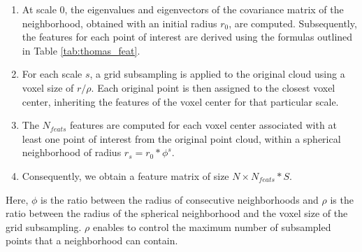 \documentclass{article}
\begin{document}
\begin{enumerate}
    \item At scale 0, the eigenvalues and eigenvectors of the covariance matrix of the neighborhood, obtained with an initial radius $r_0$, are computed. Subsequently, the features for each point of interest are derived using the formulas outlined in Table \ref{tab:thomas_feat}.
    \item  For each scale $s$, a grid subsampling is applied to the original cloud using a voxel size of $r/\rho$. Each original point is then assigned to the closest voxel center, inheriting the features of the voxel center for that particular scale. 
    \item The $N_{feats}$ features are computed for each voxel center associated with at least one point of interest from the original point cloud, within a spherical neighborhood of radius $r_s = r_0 * \phi^s$.
    \item Consequently, we obtain a feature matrix of size $N \times N_{feats} * S$.
\end{enumerate}
Here, $\phi$ is the ratio between the radius of consecutive neighborhoods and $\rho$ is the ratio between the radius of the spherical neighborhood and the voxel size of the grid subsampling. $\rho$ enables to control the maximum number of subsampled points that a neighborhood can contain.
\end{document}
